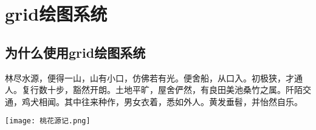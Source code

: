 

\section{grid绘图系统}
\subsection{为什么使用grid绘图系统}
\begin{frame}{\subsecname}{}
  \begin{minipage}{\textwidth}
      \begin{ornamentblock}
        { 林尽水源，便得一山，山有小口，仿佛若有光。便舍船，从口入。初极狭，才通人。复行数十步，豁然开朗。土地平旷，屋舍俨然，有良田美池桑竹之属。阡陌交通，鸡犬相闻。其中往来种作，男女衣着，悉如外人。黄发垂髫，并怡然自乐。\\
          }
      \end{ornamentblock}
  \end{minipage}
  \begin{minipage}{\textwidth}
     \centering \texttt{[image: 桃花源记.png]}
  \end{minipage}
\end{frame}

